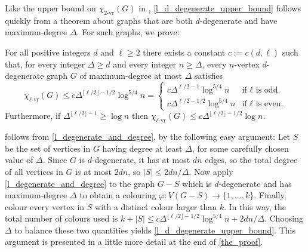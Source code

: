 \documentclass{patmorin}
\newcommand{\rn}[1]{\chi_{\operatorname{#1-vr}}}
\newcommand{\lrn}{\rn{\ell}}
\begin{document}
Like the upper bound on $\rn{2}(G)$ in \cite{karpas.neiman.ea:on}, \cref{l_d_degenerate_upper_bound} follows quickly from a theorem about graphs that are both $d$-degenerate and have maximum-degree $\Delta$. For such graphs, we prove:

\begin{thm}\label{l_degenerate_and_degree}
  For all positive integers $d$ and $\ell\ge 2$ there exists a constant $c:=c(d,\ell)$ such that, for every integer $\Delta\ge d$ and every integer $n\ge \Delta$, every $n$-vertex $d$-degenerate graph $G$ of maximum-degree at most $\Delta$ satisfies
  \[
    \lrn(G)\le c\Delta^{\lfloor\ell/2\rfloor-1/2}\log^{5/4} n
    =\begin{cases}
    c\Delta^{\ell/2-1}\log^{5/4} n & \text{if $\ell$ is odd.} \\
    c\Delta^{\ell/2-1/2}\log^{5/4} n & \text{if $\ell$ is even.}
    \end{cases}
  \]
  Furthermore, if $\Delta^{\lfloor\ell/2\rfloor-1}\ge\log n$ then $\lrn(G)\le c\Delta^{\lfloor\ell/2\rfloor-1/2}\log n$.
\end{thm}

 follows from \cref{l_degenerate_and_degree}, by the following easy argument:  Let $S$ be the set of vertices in $G$ having degree at least $\Delta$, for some carefully chosen value of $\Delta$.  Since $G$ is $d$-degenerate, it has at most $dn$ edges, so the total degree of all vertices in $G$ is at most $2dn$, so $|S|\le 2dn/\Delta$.  Now apply \cref{l_degenerate_and_degree} to the graph $G-S$ which is $d$-degenerate and has maximum-degree $\Delta$ to obtain a colouring $\varphi:V(G-S)\to\{1,\ldots,k\}$.  Finally, colour every vertex in $S$ with a distinct colour larger than $k$.  In this way, the total number of colours used is $k + |S|\le c\Delta^{\lfloor\ell/2\rfloor-1/2}\log^{5/4} n + 2dn/\Delta$. Choosing $\Delta$ to balance these two quantities yields \cref{l_d_degenerate_upper_bound}.  This argument is presented in a little more detail at the end of \cref{the_proof}.
\end{document}
